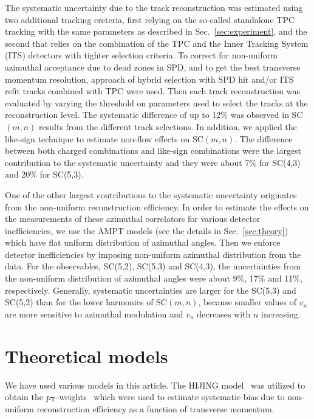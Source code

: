 \documentclass[ALICE,manyauthors]{cernphprep}
\begin{document}
The systematic uncertainty due to the track reconstruction was estimated using two additional tracking creteria, first relying on the so-called standalone TPC tracking with the 
same parameters as described in Sec.~\ref{sec:experiment}, and the second that relies on the combination of the TPC and the Inner Tracking System (ITS) detectors with tighter selection criteria.
To correct for non-uniform azimuthal acceptance due to dead zones in SPD, and to get the best transverse momentum resolution, approach of hybrid selection with SPD hit and/or ITS refit tracks combined with TPC were used. Then each track reconstruction was evaluated by varying the threshold on parameters used to select the tracks at the reconstruction level. 
The systematic difference of up to 12\% was observed in SC$(m,n)$ results from the different track selections. 
In addition, we applied the like-sign technique to estimate non-flow effects on SC$(m,n)$. The difference between both charged combinations and like-sign combinations were the largest contribution to the systematic uncertainty and they were about 7\% for SC(4,3) and 20\% for SC(5,3). 

One of the other largest contributions to the systematic uncertainty originates from the non-uniform reconstruction efficiency. In order to estimate the effects on the measurements of these azimuthal correlators for various detector inefficiencies, we use the AMPT models (see the details in Sec.~\ref{sec:theory}) which have flat uniform distribution of azimuthal angles. Then we enforce detector inefficiencies by imposing non-uniform azimuthal distribution from the data. For the observables, SC(5,2), SC(5,3) and SC(4,3), the uncertainties from the non-uniform distribution of azimuthal angles were about 9\%, 17\% and 11\%, respectively.
Generally, systematic uncertainties are larger for the SC(5,3) and SC(5,2) than for the lower harmonics of SC$(m,n)$, because smaller values of $v_n$ are more sensitive to azimuthal modulation and $v_n$ decreases with $n$ increasing. 

\section{Theoretical models}
\label{sec:models}
We have used various models in this article. The {HIJING} model~\cite{Wang:1991hta,Gyulassy:1994ew} was utilized to obtain the $p_{\rm T}$-weights~\cite{Bilandzic:2013kga} which were used to estimate systematic bias due to non-uniform reconstruction efficiency as a function of transverse momentum. 
\end{document}
